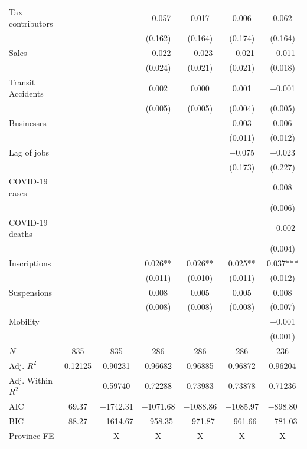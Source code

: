 \documentclass[11pt,a4paper]{article}\usepackage[]{graphicx}\usepackage[]{xcolor}
\begin{document}
\begin{table}[h]
\begin{tabular}[t]{lcccccc}
Tax contributors &  &  & \num{-0.057} & \num{0.017} & \num{0.006} & \num{0.062}\\
 &  &  & (\num{0.162}) & (\num{0.164}) & (\num{0.174}) & (\num{0.164})\\
Sales &  &  & \num{-0.022} & \num{-0.023} & \num{-0.021} & \num{-0.011}\\
 &  &  & (\num{0.024}) & (\num{0.021}) & (\num{0.021}) & (\num{0.018})\\
Transit Accidents &  &  & \num{0.002} & \num{0.000} & \num{0.001} & \num{-0.001}\\
 &  &  & (\num{0.005}) & (\num{0.005}) & (\num{0.004}) & (\num{0.005})\\
Businesses &  &  &  &  & \num{0.003} & \num{0.006}\\
 &  &  &  &  & (\num{0.011}) & (\num{0.012})\\
Lag of jobs &  &  &  &  & \num{-0.075} & \num{-0.023}\\
 &  &  &  &  & (\num{0.173}) & (\num{0.227})\\
COVID-19 cases &  &  &  &  &  & \num{0.008}\\
 &  &  &  &  &  & (\num{0.006})\\
COVID-19 deaths &  &  &  &  &  & \num{-0.002}\\
 &  &  &  &  &  & (\num{0.004})\\
Inscriptions &  &  & \num{0.026}** & \num{0.026}** & \num{0.025}** & \num{0.037}***\\
 &  &  & (\num{0.011}) & (\num{0.010}) & (\num{0.011}) & (\num{0.012})\\
Suspensions &  &  & \num{0.008} & \num{0.005} & \num{0.005} & \num{0.008}\\
 &  &  & (\num{0.008}) & (\num{0.008}) & (\num{0.008}) & (\num{0.007})\\
Mobility &  &  &  &  &  & \num{-0.001}\\
 &  &  &  &  &  & (\num{0.001})\\
\midrule
$N$ & \num{835} & \num{835} & \num{286} & \num{286} & \num{286} & \num{236}\\
Adj. $R^2$ & \num{0.12125} & \num{0.90231} & \num{0.96682} & \num{0.96885} & \num{0.96872} & \num{0.96204}\\
Adj. Within $R^2$ &  & \num{0.59740} & \num{0.72288} & \num{0.73983} & \num{0.73878} & \num{0.71236}\\
AIC & \num{69.37} & \num{-1742.31} & \num{-1071.68} & \num{-1088.86} & \num{-1085.97} & \num{-898.80}\\
BIC & \num{88.27} & \num{-1614.67} & \num{-958.35} & \num{-971.87} & \num{-961.66} & \num{-781.03}\\
Province FE &  & X & X & X & X & X\\
\bottomrule
\end{tabular}


\end{table}
\end{document}
